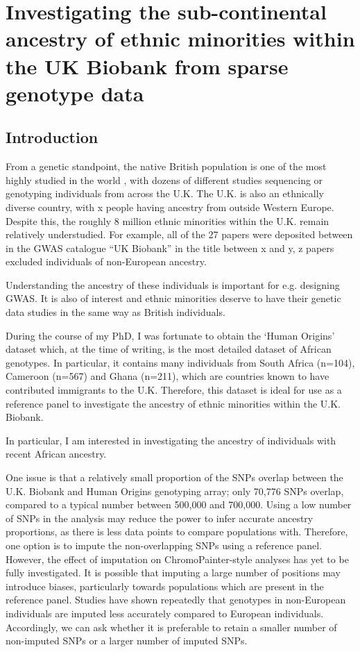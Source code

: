 \chapter{Investigating the sub-continental ancestry of ethnic minorities within the UK Biobank from sparse genotype data}
\label{chapterlabel3}

\section{Introduction}

From a genetic standpoint, the native British population is one of the most highly studied in the world \cite{Leslie2015}, with dozens of different studies sequencing or genotyping individuals from across the U.K. The U.K. is also an ethnically diverse country, with x people having ancestry from outside Western Europe. Despite this, the roughly 8 million ethnic minorities within the U.K. remain relatively understudied. For example, all of the 27 papers were deposited between  in the GWAS catalogue “UK Biobank” in the title between x and y, z papers excluded individuals of non-European ancestry. 

Understanding the ancestry of these individuals is important for e.g. designing GWAS. It is also of interest and ethnic minorities deserve to have their genetic data studies in the same way as British individuals. 

During the course of my PhD, I was fortunate to obtain the `Human Origins' dataset which, at the time of writing, is the most detailed dataset of African genotypes. In particular, it contains many individuals from South Africa (n=104), Cameroon (n=567) and Ghana (n=211), which are countries known to have contributed immigrants to the U.K. Therefore, this dataset is ideal for use as a reference panel to investigate the ancestry of ethnic minorities within the U.K. Biobank. 

In particular, I am interested in investigating the ancestry of individuals with recent African ancestry. 

One issue is that a relatively small proportion of the SNPs overlap between the U.K. Biobank and Human Origins genotyping array; only 70,776 SNPs overlap, compared to a typical number between 500,000 and 700,000. Using a low number of SNPs in the analysis may reduce the power to infer accurate ancestry proportions, as there is less data points to compare populations with. Therefore, one option is to impute the non-overlapping SNPs using a reference panel. However, the effect of imputation on ChromoPainter-style analyses has yet to be fully investigated. It is possible that imputing a large number of positions may introduce biases, particularly towards populations which are present in the reference panel. Studies have shown repeatedly that genotypes in non-European individuals are imputed less accurately compared to European individuals. Accordingly, we can ask whether it is preferable to retain a smaller number of non-imputed SNPs or a larger number of imputed SNPs. 



